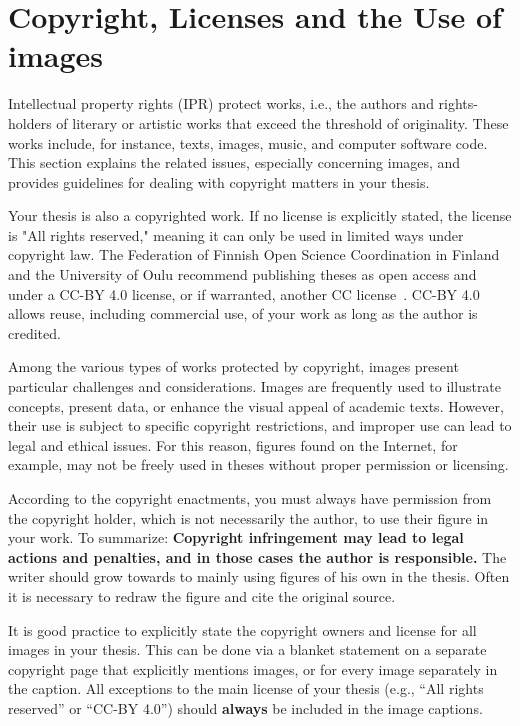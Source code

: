 \section{Copyright, Licenses and the Use of images}
\label{copyright}
Intellectual property rights (IPR) protect works, i.e., the authors
and rights-holders of literary or artistic works that exceed the
threshold of originality. These works include, for instance, texts,
images, music, and computer software code. This section explains the
related issues, especially concerning images, and provides guidelines
for dealing with copyright matters in your thesis.

Your thesis is also a copyrighted work. If no license is explicitly
stated, the license is "All rights reserved," meaning it can only be
used in limited ways under copyright law. The Federation of Finnish
Open Science Coordination in Finland and the University of Oulu
recommend publishing theses as open access and under a CC-BY 4.0 license,
or if warranted, another CC license~\cite{coordination_open_2024}.
CC-BY 4.0 allows reuse, including commercial use, of your work as long as
the author is credited.

Among the various types of works protected by copyright, images
present particular challenges and considerations. Images are
frequently used to illustrate concepts, present data, or enhance the
visual appeal of academic texts. However, their use is subject to
specific copyright restrictions, and improper use can lead to legal
and ethical issues.  For this reason, figures found on the Internet,
for example, may not be freely used in theses without proper
permission or licensing.

According to the copyright enactments, you must always have
permission from the copyright holder, which is not necessarily the
author, to use their figure in your work. To summarize:
\textbf{Copyright infringement may lead to legal actions and
penalties, and in those cases the author is responsible.} The writer
should grow towards to mainly using figures of his own in the
thesis. Often it is necessary to redraw the figure and cite the
original source.

It is good practice to explicitly state the copyright owners and
license for all images in your thesis. This can be done via a blanket
statement on a separate copyright page that explicitly mentions
images, or for every image separately in the caption. All exceptions
to the main license of your thesis (e.g., ``All rights reserved'' or
``CC-BY 4.0'') should \textbf{always} be included in the image
captions.

